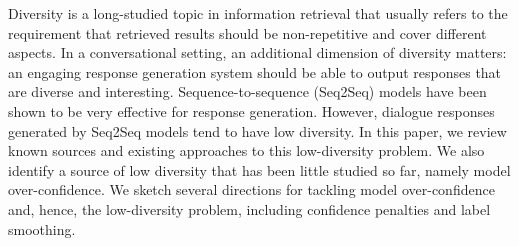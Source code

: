 Diversity is a long-studied topic in information retrieval that usually refers to the requirement that retrieved results should be non-repetitive and cover different aspects. In a conversational setting, an additional dimension of diversity matters: an engaging response generation system should be able to output responses that are diverse and interesting. Sequence-to-sequence (Seq2Seq) models have been shown to be very effective for response generation. However, dialogue responses generated by Seq2Seq models tend to have low diversity. In this paper, we review known sources and existing approaches to this low-diversity problem. We also identify a source of low diversity that has been little studied so far, namely model over-confidence. We sketch several directions for tackling model over-confidence and, hence, the low-diversity problem, including confidence penalties and label smoothing.
